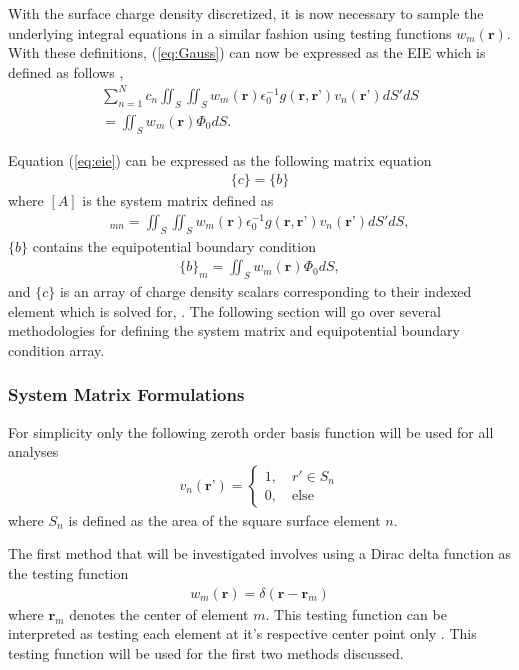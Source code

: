 With the surface charge density discretized, it is now necessary to sample the underlying integral equations in a similar fashion using testing functions $w_m(\textbf{r})$. With these definitions, (\ref{eq:Gauss}) can now be expressed as the EIE which is defined as follows \cite{rothlecnotes}, \cite{jin2011theory}
\begin{multline}
    \sum_{n=1}^{N}c_n\iint_S\iint_Sw_m(\textbf{r})\epsilon_0^{-1}g(\textbf{r},\textbf{r'})v_n(\textbf{r'})dS'dS \\ =\iint_Sw_m(\textbf{r})\Phi_0dS.
    \label{eq:eie}
\end{multline}

Equation (\ref{eq:eie}) can be expressed as the following matrix equation
\begin{align}
    [A]\{c\}=\{b\}
    \label{eq:linsys}
\end{align}
where $[A]$ is the system matrix defined as
\begin{align}
    [A]_{mn}=\iint_S\iint_Sw_m(\textbf{r})\epsilon_0^{-1}g(\textbf{r},\textbf{r'})v_n(\textbf{r'})dS'dS,
    \label{eq:a}
\end{align}
$\{b\}$ contains the equipotential boundary condition
\begin{align}
    \{b\}_m=\iint_Sw_m(\textbf{r})\Phi_0dS,
    \label{eq:b}
\end{align}
and $\{c\}$ is an array of charge density scalars corresponding to their indexed element which is solved for\cite{rothlecnotes}, \cite{jin2011theory}. The following section will go over several methodologies for defining the system matrix and equipotential boundary condition array.

\subsubsection{System Matrix Formulations}
\label{subsub:mat-form}

For simplicity only the following zeroth order basis function will be used for all analyses
\begin{align}
    v_n(\textbf{r'})=\begin{cases}
        1,\quad r'\in S_n\\
        0,\quad \mathrm{else}
    \end{cases}
\end{align}
where $S_n$ is defined as the area of the square surface element $n$.

The first method that will be investigated involves using a Dirac delta function as the testing function
\begin{align}
    w_m(\textbf{r})=\delta (\textbf{r}-\textbf{r}_m)
    \label{eq:Dirac}
\end{align} 
where $\textbf{r}_m$ denotes the center of element $m$. This testing function can be interpreted as testing each element at it's respective center point only \cite{rothlecnotes}. This testing function will be used for the first two methods discussed.

